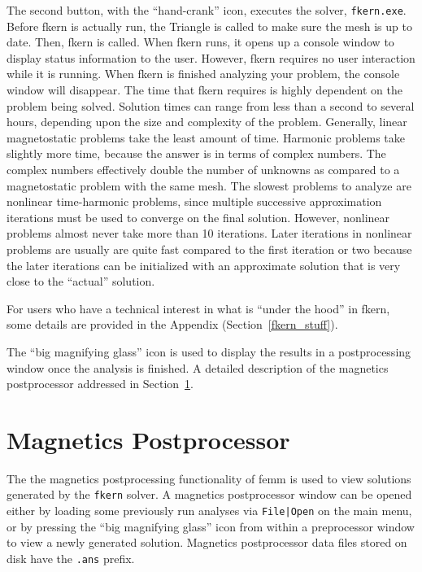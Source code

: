 \documentclass[12pt]{report}
\begin{document}
The second button, with the ``hand-crank'' icon, executes the
solver, {\tt fkern.exe}. Before fkern is actually run, the Triangle
is called to make sure the mesh is up to date. Then, fkern is
called. When fkern runs, it opens up a console window to display
status information to the user. However, fkern requires no user
interaction while it is running. When fkern is finished analyzing
your problem, the console window will disappear. The time that
fkern requires is highly dependent on the problem being solved.
Solution times can range from less than a second to several hours,
depending upon the size and complexity of the problem. Generally,
linear magnetostatic problems take the least amount of time.
Harmonic problems take slightly more time, because the answer is in
terms of complex numbers. The complex numbers effectively double
the number of unknowns as compared to a magnetostatic problem with
the same mesh. The slowest problems to analyze are nonlinear
time-harmonic problems, since multiple successive approximation
iterations must be used to converge on the final solution. However,
nonlinear problems almost never take more than 10 iterations. Later
iterations in nonlinear problems are usually are quite fast
compared to the first iteration or two because the later iterations
can be initialized with an approximate solution that is very close
to the ``actual'' solution.

For users who have a technical interest in what is ``under the
hood'' in fkern, some details are provided in the Appendix
(Section~\ref{fkern_stuff}).

The ``big magnifying glass'' icon is used to display the results in
a postprocessing window once the analysis is finished.  A detailed
description of the magnetics postprocessor addressed in
Section~\ref{ppsec}.

\section{Magnetics Postprocessor} \label{ppsec}

The the magnetics postprocessing functionality of femm is used to
view solutions generated by the {\tt fkern} solver.  A magnetics
postprocessor window can be opened either by loading some
previously run analyses via {\tt File|Open} on the main menu, or by
pressing the ``big magnifying glass'' icon from within a
preprocessor window to view a newly generated solution. Magnetics
postprocessor data files stored on disk have the {\tt .ans} prefix.
\end{document}
